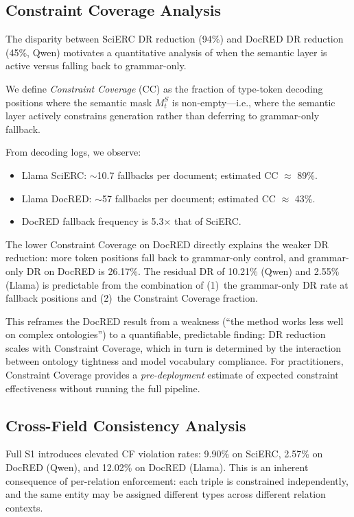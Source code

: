 \documentclass[11pt,a4paper]{article}
\begin{document}
\subsection{Constraint Coverage Analysis}
\label{sec:coverage}

The disparity between SciERC DR reduction (94\%) and DocRED DR reduction (45\%, Qwen) motivates a quantitative analysis of when the semantic layer is active versus falling back to grammar-only.

We define \emph{Constraint Coverage} (CC) as the fraction of type-token decoding positions where the semantic mask $M_t^S$ is non-empty---i.e., where the semantic layer actively constrains generation rather than deferring to grammar-only fallback.

From decoding logs, we observe:
\begin{itemize}[nosep]
    \item Llama SciERC: $\sim$10.7 fallbacks per document; estimated CC $\approx$ 89\%.
    \item Llama DocRED: $\sim$57 fallbacks per document; estimated CC $\approx$ 43\%.
    \item DocRED fallback frequency is 5.3$\times$ that of SciERC.
\end{itemize}

The lower Constraint Coverage on DocRED directly explains the weaker DR reduction: more token positions fall back to grammar-only control, and grammar-only DR on DocRED is 26.17\%.
The residual DR of 10.21\% (Qwen) and 2.55\% (Llama) is predictable from the combination of (1)~the grammar-only DR rate at fallback positions and (2)~the Constraint Coverage fraction.

This reframes the DocRED result from a weakness (``the method works less well on complex ontologies'') to a quantifiable, predictable finding: DR reduction scales with Constraint Coverage, which in turn is determined by the interaction between ontology tightness and model vocabulary compliance.
For practitioners, Constraint Coverage provides a \emph{pre-deployment} estimate of expected constraint effectiveness without running the full pipeline.

\subsection{Cross-Field Consistency Analysis}
\label{sec:cf}

Full S1 introduces elevated CF violation rates: 9.90\% on SciERC, 2.57\% on DocRED (Qwen), and 12.02\% on DocRED (Llama).
This is an inherent consequence of per-relation enforcement: each triple is constrained independently, and the same entity may be assigned different types across different relation contexts.
\end{document}
